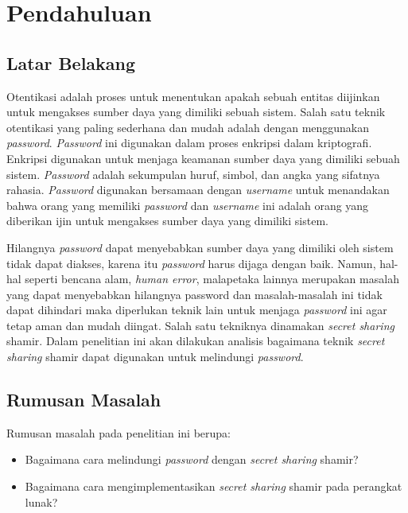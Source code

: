 \chapter{Pendahuluan}
\label{chap:Pendahuluan}

\section{\textbf{Latar Belakang}}
\label{sec:latar belakang}

Otentikasi adalah proses untuk menentukan apakah sebuah entitas diijinkan untuk mengakses sumber daya yang dimiliki sebuah sistem. Salah satu teknik otentikasi yang paling sederhana dan mudah adalah dengan menggunakan \textit{password}. \textit{Password} ini digunakan dalam proses enkripsi dalam kriptografi. Enkripsi digunakan untuk menjaga keamanan sumber daya yang dimiliki sebuah sistem. \textit{Password} adalah sekumpulan huruf, simbol, dan angka yang sifatnya rahasia. \textit{Password} digunakan bersamaan dengan \textit{username} untuk menandakan bahwa orang yang memiliki \textit{password} dan \textit{username} ini adalah orang yang diberikan ijin untuk mengakses sumber daya yang dimiliki sistem.

Hilangnya \textit{password} dapat menyebabkan sumber daya yang dimiliki oleh sistem tidak dapat diakses, karena itu \textit{password} harus dijaga dengan baik. Namun, hal-hal seperti bencana alam, \textit{human error}, malapetaka lainnya merupakan masalah yang dapat menyebabkan hilangnya password dan masalah-masalah ini tidak dapat dihindari maka diperlukan teknik lain untuk menjaga \textit{password} ini agar tetap aman dan mudah diingat. Salah satu tekniknya dinamakan \textit{secret sharing} shamir. Dalam penelitian ini akan dilakukan analisis bagaimana teknik {\it secret sharing} shamir dapat digunakan untuk melindungi \textit{password}.

\section{\textbf{Rumusan Masalah}}
\label{sec:rumusan masalah}

Rumusan masalah pada penelitian ini berupa:
\begin{itemize}
	\item Bagaimana cara melindungi \textit{password} dengan \textit{secret sharing} shamir?
	\item Bagaimana cara mengimplementasikan {\it secret sharing} shamir pada perangkat lunak?
\end{itemize}


